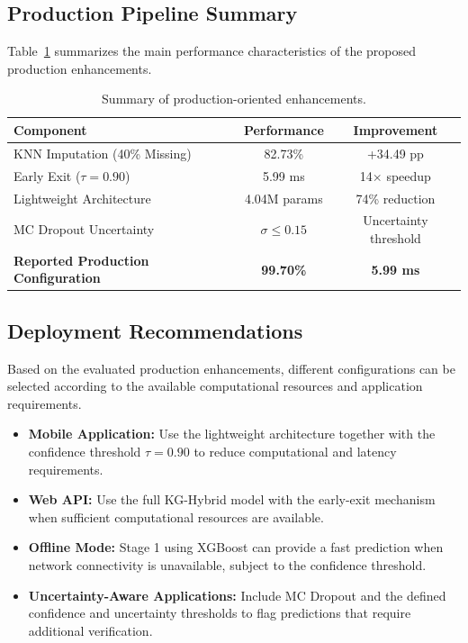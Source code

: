 \documentclass[journal]{IEEEtran}
\begin{document}
\subsection{Production Pipeline Summary}

Table~\ref{tab:production_summary} summarizes the main performance characteristics of the proposed production enhancements.

\begin{table}[t]
\centering
\caption{Summary of production-oriented enhancements.}
\label{tab:production_summary}
\begin{tabular}{lcc}
\hline
\textbf{Component} & \textbf{Performance} & \textbf{Improvement} \\
\hline
KNN Imputation (40\% Missing) & 82.73\% & +34.49 pp \\
Early Exit ($\tau=0.90$) & 5.99 ms & 14$\times$ speedup \\
Lightweight Architecture & 4.04M params & 74\% reduction \\
MC Dropout Uncertainty & $\sigma \leq 0.15$ & Uncertainty threshold \\
\hline
\textbf{Reported Production Configuration} & 
\textbf{99.70\%} & \textbf{5.99 ms} \\
\hline
\end{tabular}
\end{table}


\subsection{Deployment Recommendations}

Based on the evaluated production enhancements, different configurations can be selected according to the available computational resources and application requirements.

\begin{itemize}[leftmargin=1.2em]
    \item \textbf{Mobile Application:} Use the lightweight architecture together with the confidence threshold $\tau=0.90$ to reduce computational and latency requirements.

    \item \textbf{Web API:} Use the full KG-Hybrid model with the early-exit mechanism when sufficient computational resources are available.

    \item \textbf{Offline Mode:} Stage 1 using XGBoost can provide a fast prediction when network connectivity is unavailable, subject to the confidence threshold.

    \item \textbf{Uncertainty-Aware Applications:} Include MC Dropout and the defined confidence and uncertainty thresholds to flag predictions that require additional verification.
\end{itemize}
\end{document}
